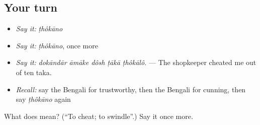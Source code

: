 \subsection*{Your turn}
\begin{itemize}
\raggedright
  \item \emph{Say it:} \emph{ṭhôkāno}
  \item \emph{Say it:} \emph{ṭhôkāno}, once more
  \item \emph{Say it:} \emph{dokāndār āmāke dôsh ṭākā ṭhôkālô.} — The shopkeeper cheated me out of ten taka.
  \item \emph{Recall:} say the Bengali for trustworthy, then the Bengali for cunning, then say \emph{ṭhôkāno} again
\end{itemize}

\begin{tcolorbox}[breakable,colback=teal!4,colframe=teal!35!black,title={Before you move on}]
What does  mean? (\textquotedblleft{}To cheat; to swindle\textquotedblright{}.) Say it once more.
\end{tcolorbox}
